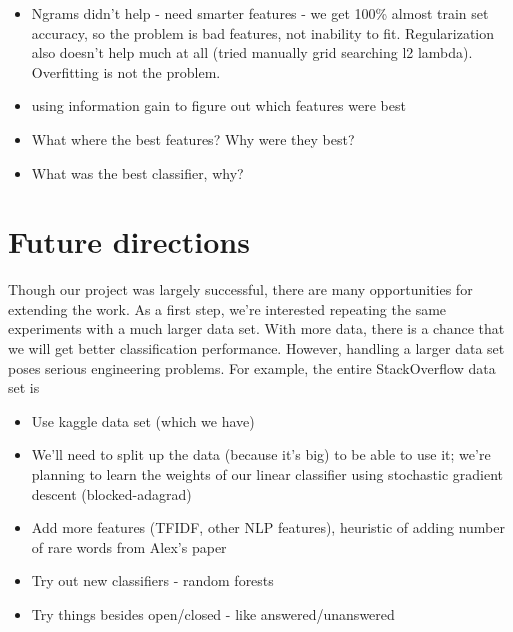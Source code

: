 \documentclass[11pt]{article}
\begin{document}
\begin{itemize}
  \item Ngrams didn’t help - need smarter features - we get 100\%
    almost train set accuracy, so the problem is bad features, not
    inability to fit. Regularization also doesn’t help much at all
    (tried manually grid searching l2 lambda). Overfitting is not the
    problem.
  \item using information gain to figure out which features were best
  \item What where the best features? Why were they best?
  \item What was the best classifier, why?
\end{itemize}

\section{Future directions}
Though our project was largely successful, there are many
opportunities for extending the work.  As a first step, we're
interested repeating the same experiments with a much larger data
set. With more data, there is a chance that we will get better
classification performance.  However, handling a larger data set poses
serious engineering problems.  For example, the entire
StackOverflow data set is

\begin{itemize}
\item Use kaggle data set (which we have)
\item We’ll need to split up the data (because it’s big) to be able to use it; we’re planning to learn the weights of our linear classifier using stochastic gradient descent (blocked-adagrad)
\item Add more features (TFIDF, other NLP features), heuristic of adding number of rare words from Alex’s paper
\item Try out new classifiers - random forests
\item Try things besides open/closed - like answered/unanswered
\end{itemize}

{}

\end{document}
